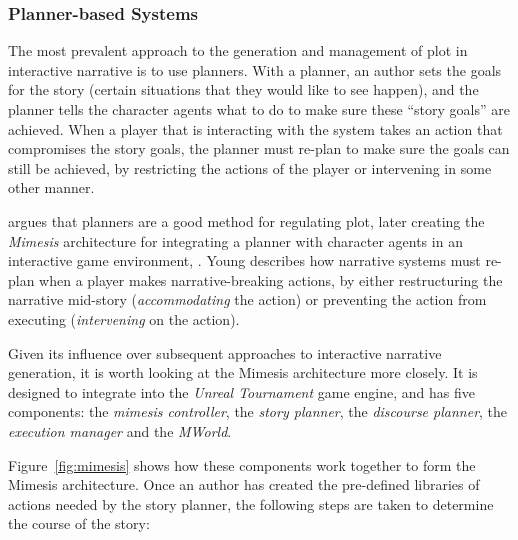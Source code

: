 \documentclass[11pt]{report}
\begin{document}
\subsubsection{Planner-based Systems}
\label{sec:planner-systems}
The most prevalent approach to the generation and management of plot in
interactive narrative is to use planners. With a planner, an author sets the
goals for the story (certain situations that they would like to see happen), and
the planner tells the character agents what to do to make sure these ``story
goals'' are achieved. When a player that is interacting with the system takes an
action that compromises the story goals, the planner must re-plan to make sure
the goals can still be achieved, by restricting the actions of the player or
intervening in some other manner.

\citet{young1999notes} argues that planners are a good method for regulating
plot, later creating the \emph{Mimesis} architecture for integrating a planner with character agents in an interactive game environment, \citep{young2004architecture}. Young describes how narrative systems must re-plan when a player makes  narrative-breaking actions, by either restructuring the narrative mid-story (\emph{accommodating} the action) or preventing the action from executing (\emph{intervening} on the action).

Given its influence over subsequent approaches to interactive narrative
generation, it is worth looking at the Mimesis architecture more closely.
It is designed to integrate into the \emph{Unreal
  Tournament} game engine, and has five components: the \emph{mimesis
  controller}, the \emph{story planner}, the \emph{discourse planner}, the
\emph{execution manager} and the \emph{MWorld}.

Figure~\ref{fig:mimesis} shows how these components work together to form the
Mimesis architecture. Once an author has created the pre-defined libraries of
actions needed by the story planner, the following steps are taken to determine
the course of the story:
\end{document}
